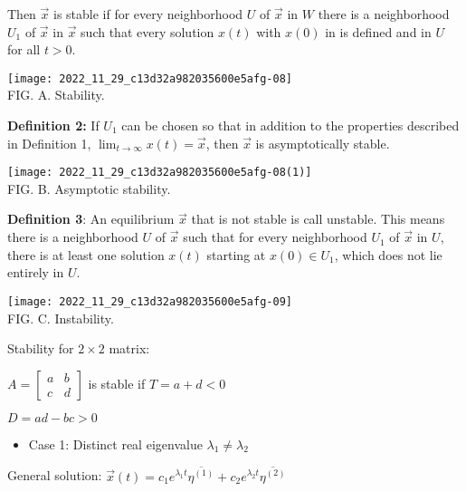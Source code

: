 \documentclass[a4paper]{article}
\begin{document}
Then $\vec{x}$ is stable if for every neighborhood $U$ of $\vec{x}$ in $W$ there is a neighborhood $U_{1}$ of $\vec{x}$ in $\vec{x}$ such that every solution $x(t)$ with $x(0)$ in is defined and in $U$ for all $t>0$.

\begin{center}
	\texttt{[image: 2022\_11\_29\_c13d32a982035600e5afg-08]}\\
	FIG. A. Stability.
\end{center}



\textbf{Definition 2:} If $U_{1}$ can be chosen so that in addition to the properties described in Definition 1, $\lim _{t \rightarrow \infty} x(t)=\vec{x}$, then $\vec{x}$ is asymptotically stable.

\begin{center}
	\texttt{[image: 2022\_11\_29\_c13d32a982035600e5afg-08(1)]}\\
	FIG. B. Asymptotic stability.
\end{center}



\textbf{Definition 3}: An equilibrium $\vec{x}$ that is not stable is call unstable. This means there is a neighborhood $U$ of $\vec{x}$ such that for every neighborhood $U_{1}$ of $\vec{x}$ in $U$, there is at least one solution $x(t)$ starting at $x(0) \in U_{1}$, which does not lie entirely in $U$.

\begin{center}
	\texttt{[image: 2022\_11\_29\_c13d32a982035600e5afg-09]}\\
	FIG. C. Instability.
\end{center}



Stability for $2 \times 2$ matrix:

$A=\left[\begin{array}{ll}a & b \\ c & d\end{array}\right]$ is stable if $T=a+d<0$

$D=a d-b c>0$

\begin{itemize}
	\item Case 1: Distinct real eigenvalue $\lambda_{1} \neq \lambda_{2}$
\end{itemize}

General solution: $\vec{x}(t)=c_{1} e^{\lambda_{1} t} \overline{\eta^{(1)}}+c_{2} e^{\lambda_{2} t} \overline{\eta^{(2)}}$
\end{document}
